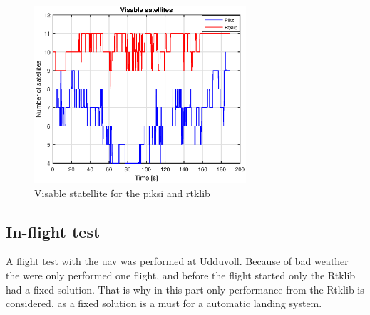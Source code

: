 \begin{figure}[H]
	\centering
		\includegraphics[width=0.7\textwidth]{figs/plots/numSatWalk2.eps}
		\caption{Visable statellite for the piksi and rtklib}
		\label{figure:numSatWalk2}
\end{figure}
\subsection{In-flight test}
A flight test with the \gls{uav} was performed at Udduvoll. Because of bad weather the were only performed one flight, and before the flight started only the Rtklib had a fixed solution. That is why in this part only performance from the Rtklib is considered, as a fixed solution is a must for a automatic landing system. 

